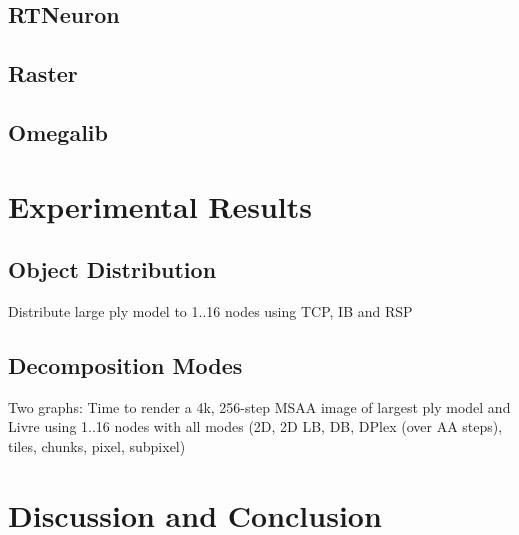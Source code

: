 \documentclass[journal]{vgtc}                %
\begin{document}
\subsection{RTNeuron}
\cite{HBBES:13}

\subsection{Raster}
\subsection{Omegalib}

\section{Experimental Results}
\label{SEC_results}

\subsection{Object Distribution}

Distribute large ply model to 1..16 nodes using TCP, IB and RSP

\subsection{Decomposition Modes}

Two graphs: Time to render a 4k, 256-step MSAA image of largest ply model and
Livre using 1..16 nodes with all modes (2D, 2D LB, DB, DPlex (over AA steps),
tiles, chunks, pixel, subpixel)

\section{Discussion and Conclusion}
\label{SEC_conclusions}



\vspace{-2mm}
\footnotesize


\end{document}
